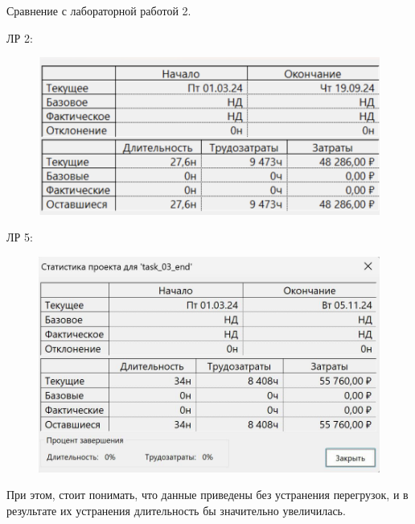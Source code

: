 Сравнение с лабораторной работой 2.

ЛР 2:

\begin{figure}[h!]
	\begin{center}
		\includegraphics[scale=0.6]{inc/img/p_9.png}
	\end{center}
	\captionsetup{justification=centering}
	\label{fig:u3}
\end{figure}

ЛР 5:

\begin{figure}[h!]
	\begin{center}
		\includegraphics[scale=0.35]{inc/img/p_16.jpg}
	\end{center}
	\captionsetup{justification=centering}
	\label{fig:u3}
\end{figure}

При этом, стоит понимать, что данные приведены без устранения перегрузок, и в результате их устранения длительность бы значительно увеличилась.